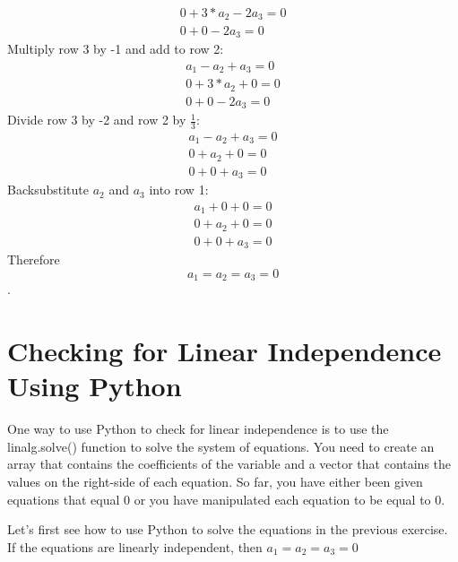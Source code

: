 \begin{Answer}[ref=vector_independence]
$$\begin{matrix}
			0 + 3*a_2 -2a_3 = 0 \\
			0 + 0 - 2a_3 = 0
		  \end{matrix} $$
	Multiply row 3 by -1 and add to row 2:
		$$\begin{matrix}
			a_1 - a_2 + a_3 = 0 \\
			0 + 3*a_2 + 0 = 0 \\
			0 + 0 - 2a_3 = 0
		\end{matrix} $$
    Divide row 3 by -2 and row 2 by $\frac{1}{3}$:
    	$$\begin{matrix}
			a_1 - a_2 + a_3 = 0 \\
			0 +  a_2 +0  = 0 \\
			0  + 0  + a_3 = 0
		\end{matrix} $$
	Backsubstitute $a_2$ and $a_3$ into row 1:
	 	$$\begin{matrix}
			a_1 + 0 + 0 = 0 \\
			0 +  a_2 + 0   = 0 \\
			0   + 0  + a_3 = 0
		\end{matrix} $$
	 Therefore $$a_1 = a_2 = a_3 = 0$$.
\end{Answer}
    
\section{Checking for Linear Independence Using Python}  
One way to use Python to check for linear independence is to use the linalg.solve() function to solve the system of equations. You need to create an array that contains the coefficients of the variable and a vector that contains the values on the right-side of each equation. So far, you have either been given equations that equal 0 or you have manipulated each equation to be equal to 0. 

Let's first see how to use Python to solve the equations in the previous exercise. If the equations are linearly independent, then $a_1 = a_2 = a_3 = 0$

